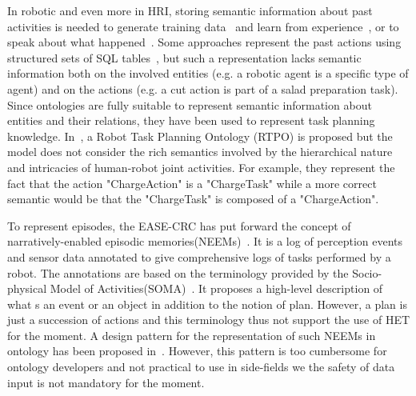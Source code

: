 In robotic and even more in HRI, storing semantic information about past activities is needed to generate training data~\cite{diab_2020_knowing} and learn from experience~\cite{petit_2016_reasoning}, or to speak about what happened~\cite{mealier_2017_narrative}. Some approaches represent the past actions using structured sets of SQL tables~\cite{mealier_2017_narrative}, but such a representation lacks semantic information both on the involved entities (e.g. a robotic agent is a specific type of agent) and on the actions (e.g. a cut action is part of a salad preparation task). Since ontologies are fully suitable to represent semantic information about entities and their relations, they have been used to represent task planning knowledge. In~\cite{sun_2019_rtpo}, a Robot Task Planning Ontology (RTPO) is proposed but the model does not consider the rich semantics involved by the hierarchical nature and intricacies of human-robot joint activities. For example, they represent the fact that the action "ChargeAction" is a "ChargeTask" while a more correct semantic would be that the "ChargeTask" is composed of a "ChargeAction".

To represent episodes, the EASE-CRC has put forward the concept of narratively-enabled episodic memories(NEEMs)~\cite{diab_2020_knowing}. It is a log of perception events and sensor data annotated to give comprehensive logs of tasks performed by a robot. The annotations are based on the terminology provided by the Socio-physical Model of Activities(SOMA)~\cite{bessler_2020_foundations}. It proposes a high-level description of what s an event or an object in addition to the notion of plan. However, a plan is just a succession of actions and this terminology thus not support the use of HET for the moment. A design pattern for the representation of such NEEMs in ontology has been proposed in~\cite{bernd_2020_modelling}. However, this pattern is too cumbersome for ontology developers and not practical to use in side-fields we the safety of data input is not mandatory for the moment.

